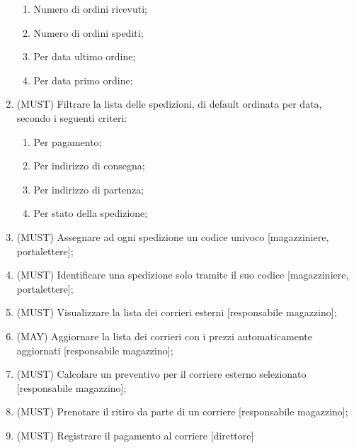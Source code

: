 \documentclass[a4paper,12pt]{article}
\begin{document}
\begin{enumerate}
\begin{enumerate}
        \item{Numero di ordini ricevuti};
        \item{Numero di ordini spediti};
        \item{Per data ultimo ordine};
        \item{Per data primo ordine};
      \end{enumerate}
    \item{(MUST)} Filtrare la lista delle spedizioni, di default ordinata per data, secondo i seguenti criteri:
      \begin{enumerate}
        \item{Per pagamento};
        \item{Per indirizzo di consegna};
        \item{Per indirizzo di partenza};
        \item{Per stato della spedizione};
      \end{enumerate}
    \item{(MUST)} Assegnare ad ogni spedizione un codice univoco [magazziniere, portalettere];
    \item{(MUST)} Identificare una spedizione solo tramite il suo codice [magazziniere, portalettere];
    \item{(MUST)} Visualizzare la lista dei corrieri esterni [responsabile magazzino];
    \item{(MAY)}  Aggiornare la lista dei corrieri con i prezzi automaticamente aggiornati [responsabile magazzino];
    \item{(MUST)} Calcolare un preventivo per il corriere esterno selezionato [responsabile magazzino];
    \item{(MUST)} Prenotare il ritiro da parte di un corriere [responsabile magazzino];
    \item{(MUST)} Registrare il pagamento al corriere [direttore]
  \end{enumerate}
\end{document}
